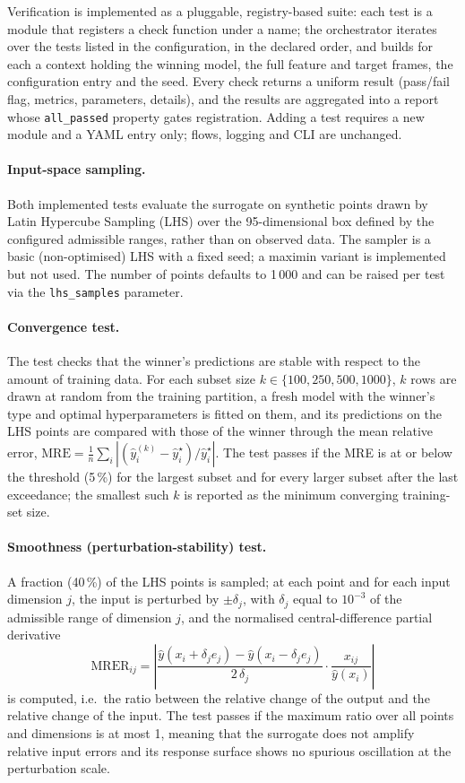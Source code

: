 Verification is implemented as a pluggable, registry-based suite: each test
is a module that registers a check function under a name; the orchestrator
iterates over the tests listed in the configuration, in the declared order,
and builds for each a context holding the winning model, the full feature and
target frames, the configuration entry and the seed. Every check returns a
uniform result (pass/fail flag, metrics, parameters, details), and the
results are aggregated into a report whose \texttt{all\_passed} property
gates registration. Adding a test requires a new module and a YAML entry
only; flows, logging and CLI are unchanged.

\paragraph{Input-space sampling.}
Both implemented tests evaluate the surrogate on synthetic points drawn by
Latin Hypercube Sampling (LHS) over the 95-dimensional box defined by the
configured admissible ranges, rather than on observed data. The sampler is a
basic (non-optimised) LHS with a fixed seed; a maximin variant is implemented
but not used. The number of points defaults to 1\,000 and can be raised per
test via the \texttt{lhs\_samples} parameter.

\paragraph{Convergence test.}
The test checks that the winner's predictions are stable with respect to the
amount of training data. For each subset size $k \in \{100, 250, 500,
1000\}$, $k$ rows are drawn at random from the training partition, a fresh
model with the winner's type and optimal hyperparameters is fitted on them,
and its predictions on the LHS points are compared with those of the winner
through the mean relative error, $\mathrm{MRE} = \frac{1}{n}\sum_i
|(\hat y^{(k)}_i - \hat y^{\star}_i)/\hat y^{\star}_i|$. The test passes if
the MRE is at or below the threshold (5\,\%) for the largest subset and for
every larger subset after the last exceedance; the smallest such $k$ is
reported as the minimum converging training-set size.

\paragraph{Smoothness (perturbation-stability) test.}
A fraction (40\,\%) of the LHS points is sampled; at each point and for each
input dimension $j$, the input is perturbed by $\pm\delta_j$, with $\delta_j$
equal to $10^{-3}$ of the admissible range of dimension $j$, and the
normalised central-difference partial derivative
\[
  \mathrm{MRER}_{ij} =
  \left|\frac{\hat y(x_i + \delta_j e_j) - \hat y(x_i - \delta_j e_j)}{2\,\delta_j}
  \cdot \frac{x_{ij}}{\hat y(x_i)}\right|
\]
is computed, i.e.\ the ratio between the relative change of the output and
the relative change of the input. The test passes if the maximum ratio over
all points and dimensions is at most 1, meaning that the surrogate does not
amplify relative input errors and its response surface shows no spurious
oscillation at the perturbation scale.

